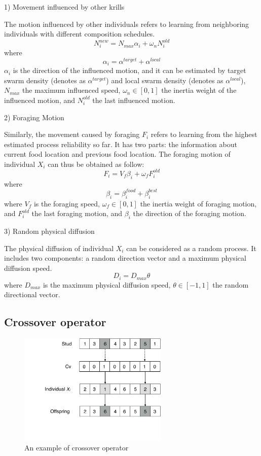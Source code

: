 \documentclass[journal]{IEEEtran}
\begin{document}
1) Movement influenced by other krills

The motion influenced by other individuals refers to learning from neighboring individuals with different composition schedules.
\begin{equation}
N^{new}_i = N_{max}\alpha_i + \omega_n N^{old}_i
\end{equation}
where
\begin{equation}
\alpha_i = \alpha^{target} + \alpha^{local}
\end{equation}
$\alpha_i$ is the direction of the influenced motion, and it can be estimated by target swarm density (denotes as $\alpha^{target}$) and local swarm density (denotes as $\alpha^{local}$), $N_{max}$ the maximum influenced speed, $\omega_n \in [0, 1]$ the inertia weight of the influenced motion, and $N^{old}_{i}$ the last influenced motion.

2) Foraging Motion

Similarly, the movement caused by foraging $F_i$ refers to learning from the highest estimated process reliability so far. 
It has two parts: the information about current food location and previous food location. 
The foraging motion of individual $X_i$ can thus be obtained as follow:
\begin{equation}
F_i = V_f\beta_i + \omega_f F^{old}_i
\end{equation}
where
\begin{equation}
\beta_i = \beta_i^{food}+\beta_i^{best}
\end{equation}
where $V_f$ is the foraging speed, $\omega_f \in [0, 1]$ the inertia weight of foraging motion, and $F^{old}_i$ the last foraging motion, and $\beta_i$ the direction of the foraging motion.

3) Random physical diffusion

The physical diffusion of individual $X_i$ can be considered as a random process. It includes two components: a random direction vector and a maximum physical diffusion speed.
\begin{equation}
D_i = D_{max}\theta
\end{equation}
where $D_{max}$ is the maximum physical diffusion speed, $\theta \in [-1, 1]$ the random directional vector.

\subsection{Crossover operator}

\begin{figure}[!t]
\centering
\includegraphics[width=2.8in]{./img/pic7.pdf}
\caption{An example of crossover operator}
\label{Crossover operator}
\end{figure}
\end{document}
